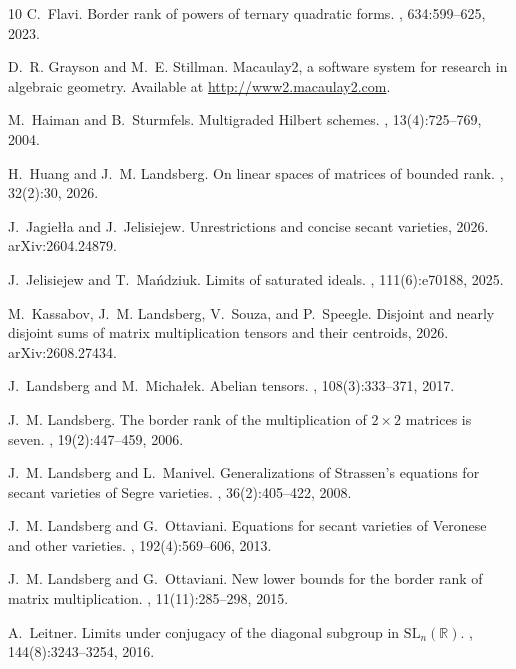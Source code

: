 \documentclass[12pt]{amsart}
\theoremstyle{definition}
\theoremstyle{remark}
\theoremstyle{definition}
\begin{document}
\begin{thebibliography}{10}
C.~Flavi.
\newblock Border rank of powers of ternary quadratic forms.
, 634:599--625, 2023.

D.~R. Grayson and M.~E. Stillman.
\newblock Macaulay2, a software system for research in algebraic geometry.
\newblock Available at \url{http://www2.macaulay2.com}.

M.~Haiman and B.~Sturmfels.
\newblock Multigraded {H}ilbert schemes.
, 13(4):725--769, 2004.

H.~Huang and J.~M. Landsberg.
\newblock On linear spaces of matrices of bounded rank.
, 32(2):30, 2026.

J.~Jagiełła and J.~Jelisiejew.
\newblock Unrestrictions and concise secant varieties, 2026.
\newblock arXiv:2604.24879.

J.~Jelisiejew and T.~Mańdziuk.
\newblock Limits of saturated ideals.
, 111(6):e70188, 2025.

M.~Kassabov, J.~M. Landsberg, V.~Souza, and P.~Speegle.
\newblock Disjoint and nearly disjoint sums of matrix multiplication tensors
  and their centroids, 2026.
\newblock arXiv:2608.27434.

J.~Landsberg and M.~Michałek.
\newblock Abelian tensors.
, 108(3):333--371, 2017.

J.~M. Landsberg.
\newblock The border rank of the multiplication of $2 \times 2$ matrices is
  seven.
, 19(2):447--459, 2006.

J.~M. Landsberg and L.~Manivel.
\newblock Generalizations of {S}trassen's equations for secant varieties of
  {S}egre varieties.
, 36(2):405--422, 2008.

J.~M. Landsberg and G.~Ottaviani.
\newblock Equations for secant varieties of {V}eronese and other varieties.
, 192(4):569--606, 2013.

J.~M. Landsberg and G.~Ottaviani.
\newblock New lower bounds for the border rank of matrix multiplication.
, 11(11):285--298, 2015.

A.~Leitner.
\newblock Limits under conjugacy of the diagonal subgroup in
  {$\mathrm{SL}_n(\mathbb{R})$}.
, 144(8):3243--3254, 2016.


\end{thebibliography}
\end{document}
